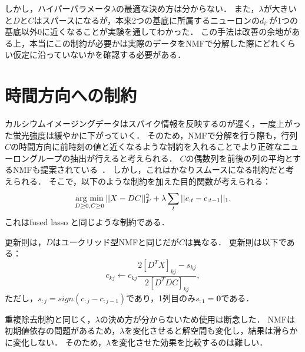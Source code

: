 しかし，ハイパーパラメータ$\lambda$の最適な決め方は分からない．
また，$\lambda$が大きいと$D$と$C$はスパースになるが，本来2つの基底に所属するニューロンの$d_{i:}$が1つの基底以外0に近くなることが実験を通してわかった．
この手法は改善の余地がある上，本当にこの制約が必要かは実際のデータをNMFで分解した際にどれくらい仮定に沿っていないかを確認する必要がある．

\section{時間方向への制約}
カルシウムイメージングデータはスパイク情報を反映するのが遅く，一度上がった蛍光強度は緩やかに下がっていく．
そのため，NMFで分解を行う際も，行列$C$の時間方向に前時刻の値と近くなるような制約を入れることでより正確なニューロングループの抽出が行えると考えられる．
$C$の偶数列を前後の列の平均とするNMFも提案されている~\cite{Cheung2015}．
しかし，これはかなりスムースになる制約だと考えられる．
そこで，以下のような制約を加えた目的関数が考えられる：
\begin{equation}
	\mathop{\textrm{arg~min}}\limits_{D \geq 0, C \geq 0}||X - DC||^2_F + \lambda \sum_t||c_{:t} - c_{:t-1}||_1.
  \label{eq:NMF-ar}
\end{equation}
これはfused lasso \cite{Tibshirani2005}と同じような制約である．

更新則は，$D$はユークリッド型NMFと同じだが$C$は異なる．
更新則は以下である：
\begin{equation}
	c_{kj} \leftarrow c_{kj} \frac{2[D^T X]_{kj} - s_{kj}}{2[D^T DC]_{kj}},
\end{equation}
ただし，$s_{:j} = sign(c_{:j} - c_{:j-1})$であり，1列目のみ$s_{:1} = \mathbf{0}$である．

重複除去制約と同じく，$\lambda$の決め方が分からないため使用は断念した．
NMFは初期値依存の問題があるため，$\lambda$を変化させると解空間も変化し，結果は滑らかに変化しない．
そのため，$\lambda$を変化させた効果を比較するのは難しい．
